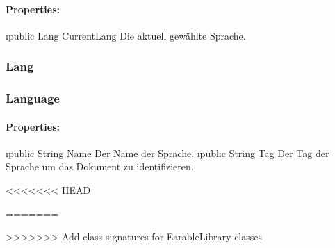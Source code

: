 \documentclass[../entwurf.tex]{subfiles}
\begin{document}
				\paragraph{Properties:}
					\begin{itemize}
						\i{public Lang CurrentLang} Die aktuell gewählte Sprache.
					\end{itemize}
			\subsubsection{Lang}
			\subsubsection{Language}
				\paragraph{Properties:}
					\begin{itemize}
						\i{public String Name} Der Name der Sprache.
						\i{public String Tag} Der Tag der Sprache um das Dokument zu identifizieren.
					\end{itemize}
<<<<<<< HEAD


=======

>>>>>>> Add class signatures for EarableLibrary classes
\end{document}
